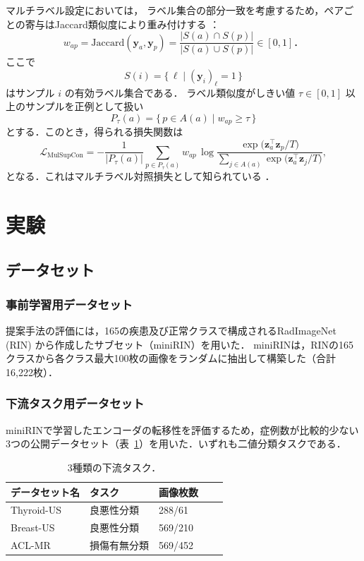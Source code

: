 マルチラベル設定においては，
ラベル集合の部分一致を考慮するため，ペアごとの寄与はJaccard類似度により重み付けする \cite{zaigrajew_contrastive_2022}：
\[
  w_{ap}
  = \mathrm{Jaccard}(\mathbf y_a,\mathbf y_p)
  = \frac{\lvert S(a)\cap S(p)\rvert}{\lvert S(a)\cup S(p)\rvert}
  \in [0,1]．
\]
ここで
\[
S(i)=\{\,\ell \mid (\mathbf y_i)_\ell=1\,\}
\]
はサンプル $i$ の有効ラベル集合である．
ラベル類似度がしきい値 $\tau \in [0,1]$ 以上のサンプルを正例として扱い
\[
  P_{\tau}(a)=\{\,p \in A(a)\mid w_{ap}\ge \tau\,\}
\]
とする．このとき，得られる損失関数は
\begin{equation}
  \mathcal{L}_{\mathrm{MulSupCon}}
  = -\frac{1}{\lvert P_{\tau}(a)\rvert}
    \sum_{p\in P_{\tau}(a)}
    w_{ap}\,
    \log
    \frac{\exp\!\bigl(\mathbf z_a^{\top}\mathbf z_p/T\bigr)}
         {\displaystyle\sum_{j\in A(a)}
          \exp\!\bigl(\mathbf z_a^{\top}\mathbf z_j/T\bigr)} ,
  \label{eq:supcon-ja}
\end{equation}
となる．これはマルチラベル対照損失として知られている \cite{zaigrajew_contrastive_2022}．

\section{実験}
\subsection{データセット}
\subsubsection{事前学習用データセット}
\label{ssec:dataset-ja}
提案手法の評価には，165の疾患及び正常クラスで構成されるRadImageNet (RIN) \cite{mei_radimagenet_2022}から作成したサブセット（miniRIN）を用いた． 
miniRINは，RINの165クラスから各クラス最大100枚の画像をランダムに抽出して構築した（合計16,222枚）．

\subsubsection{下流タスク用データセット}
miniRINで学習したエンコーダの転移性を評価するため，症例数が比較的少ない3つの公開データセット（表~\ref{tab:down_ds}）を用いた．いずれも二値分類タスクである．

\begin{table}[h]
    \centering
    \caption{3種類の下流タスク．}
    \label{tab:down_ds}
    \begin{tabular}{lllll}
        \toprule
        データセット名 & タスク &  画像枚数 \\
        \midrule
        Thyroid-US \cite{pedraza_open_2015}  & 良悪性分類 & 288/61 & \\
        Breast-US \cite{al-dhabyani_dataset_2020}  & 良悪性分類  & 569/210 & \\
        ACL-MR \cite{bien_deep-learning-assisted_2018} & 損傷有無分類 & 569/452 &  \\
        \bottomrule
    \end{tabular}
\end{table}

